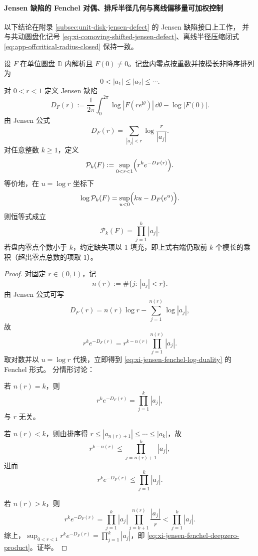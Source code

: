 \paragraph{Jensen 缺陷的 Fenchel 对偶、排斥半径几何与离线偏移量可加权控制}
以下结论在附录 \ref{subsec:unit-disk-jensen-defect} 的 Jensen 缺陷接口上工作，
并与共动圆盘化记号 \eqref{eq:xi-comoving-shifted-jensen-defect}、离线半径压缩闭式
\eqref{eq:app-offcritical-radius-closed} 保持一致。

\begin{theorem}\label{thm:xi-jensen-fenchel-deepzero-product-functional}
设 \(F\) 在单位圆盘 \(\mathbb D\) 内解析且 \(F(0)\neq 0\)。记盘内零点按重数并按模长非降序排列为
\[
0<|a_1|\le |a_2|\le \cdots .
\]
对 \(0<r<1\) 定义 Jensen 缺陷
\[
D_F(r):=\frac{1}{2\pi}\int_0^{2\pi}\log|F(re^{\mathrm i\theta})|\,\dd\theta-\log|F(0)|.
\]
由 Jensen 公式
\[
D_F(r)=\sum_{|a_j|<r}\log\frac{r}{|a_j|}.
\]
对任意整数 \(k\ge 1\)，定义
\[
\mathcal P_k(F):=\sup_{0<r<1}\Bigl(r^k e^{-D_F(r)}\Bigr).
\]
等价地，在 \(u=\log r\) 坐标下
\begin{equation}\label{eq:xi-jensen-fenchel-log-duality}
\log\mathcal P_k(F)=\sup_{u<0}\Bigl(ku-D_F(e^u)\Bigr).
\end{equation}
则恒等式成立
\begin{equation}\label{eq:xi-jensen-fenchel-deepzero-product}
\boxed{\;
\mathcal P_k(F)=\prod_{j=1}^{k}|a_j|.\;}
\end{equation}
若盘内零点个数小于 \(k\)，约定缺失项以 \(1\) 填充，即上式右端仍取前 \(k\) 个模长的乘积（超出零点总数的项取 \(1\)）。
\end{theorem}
\begin{proof}
对固定 \(r\in(0,1)\)，记
\[
n(r):=\#\{j:\ |a_j|<r\}.
\]
由 Jensen 公式可写
\[
D_F(r)=n(r)\log r-\sum_{j=1}^{n(r)}\log|a_j|,
\]
故
\[
r^k e^{-D_F(r)}
=r^{k-n(r)}\prod_{j=1}^{n(r)}|a_j|.
\]
取对数并以 \(u=\log r\) 代换，立即得到
\eqref{eq:xi-jensen-fenchel-log-duality} 的 Fenchel 形式。
分情形讨论：

若 \(n(r)=k\)，则
\[
r^k e^{-D_F(r)}=\prod_{j=1}^{k}|a_j|,
\]
与 \(r\) 无关。

若 \(n(r)<k\)，则由排序得
\(
r\le |a_{n(r)+1}|\le\cdots\le |a_k|
\)，故
\[
r^{k-n(r)}\le \prod_{j=n(r)+1}^{k}|a_j|,
\]
进而
\[
r^k e^{-D_F(r)}
\le \prod_{j=1}^{k}|a_j|.
\]

若 \(n(r)>k\)，则
\[
r^k e^{-D_F(r)}
=\prod_{j=1}^{k}|a_j|
\prod_{j=k+1}^{n(r)}\frac{|a_j|}{r}
<\prod_{j=1}^{k}|a_j|.
\]
综上，\(\sup_{0<r<1}r^k e^{-D_F(r)}=\prod_{j=1}^{k}|a_j|\)，即
\eqref{eq:xi-jensen-fenchel-deepzero-product}。证毕。
\end{proof}

